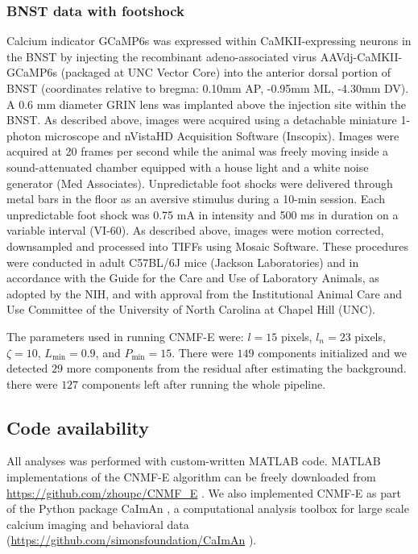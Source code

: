 \documentclass[9pt,lineno]{elife}
\begin{document}
\subsubsection{BNST data with footshock}
Calcium indicator GCaMP6s was expressed within CaMKII-expressing neurons in the BNST by injecting the recombinant adeno-associated virus AAVdj-CaMKII-GCaMP6s (packaged at UNC Vector Core) into the anterior dorsal portion of BNST (coordinates relative to bregma: 0.10mm AP, -0.95mm ML, -4.30mm DV). A 0.6 mm diameter GRIN lens was implanted above the injection site within the BNST. As described above, images were acquired using a detachable miniature 1-photon microscope and nVistaHD Acquisition Software (Inscopix).  Images were acquired at 20 frames per second while the animal was freely moving inside a sound-attenuated chamber equipped with a house light and a white noise generator (Med Associates).  Unpredictable foot shocks were delivered through metal bars in the floor as an aversive stimulus during a 10-min session.  Each unpredictable foot shock was 0.75 mA in intensity and 500 ms in duration on a variable interval (VI-60). As described above, images were motion corrected, downsampled and processed into TIFFs using Mosaic Software. These procedures were conducted in adult C57BL/6J mice (Jackson Laboratories) and in accordance with the Guide for the Care and Use of Laboratory Animals, as adopted by the NIH, and with approval from the Institutional Animal Care and Use Committee of the University of North Carolina at Chapel Hill (UNC).  

The parameters used in running CNMF-E were:  $l=15$ pixels, $l_n=23$ pixels, $\zeta=10$, $L_{\min}=0.9$, and $P_{\min}=15$. There were $149$ components initialized and we detected $29$ more components from the residual after estimating the background. there were $127$ components left after running the whole pipeline.  %

\subsection{Code availability}
All analyses was performed with custom-written MATLAB code. MATLAB implementations of the CNMF-E algorithm can be freely downloaded from \url{https://github.com/zhoupc/CNMF_E} \citep{Zhou2017code}. We also implemented CNMF-E as part of the Python package CaImAn \citep{giovannucci2017}, a computational analysis toolbox for large scale calcium imaging and behavioral data (\url{https://github.com/simonsfoundation/CaImAn} \citep{giovannucci2017code}). 
\end{document}
